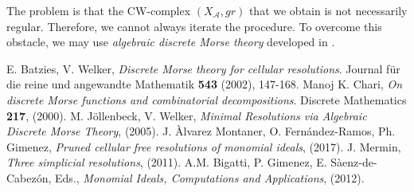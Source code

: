 \documentclass[paper=a4, fontsize=11pt]{scrartcl} %
\theoremstyle{plain}
\theoremstyle{definition}
\begin{document}
The problem is that the CW-complex $(X_{\mathcal{A}},gr)$ that we obtain is not necessarily regular. Therefore, we cannot always iterate the procedure. To overcome this obstacle, we may use \textit{algebraic discrete Morse theory} developed in \cite{JoWe}.

\begin{thebibliography}{9}
E. Batzies, V. Welker, \textit{Discrete Morse theory for cellular resolutions}. Journal f{\"u}r die reine und angewandte Mathematik \textbf{543} (2002), 147-168.
Manoj K. Chari, \textit{On discrete Morse functions and combinatorial decompositions}. Discrete Mathematics \textbf{217}, (2000).
M. J{\"o}llenbeck, V. Welker, \textit{Minimal Resolutions via Algebraic Discrete Morse Theory}, (2005).
J. \`Alvarez Montaner, O. Fern\'andez-Ramos, Ph. Gimenez, \textit{Pruned cellular free resolutions of monomial ideals}, (2017).
J. Mermin, \textit{Three simplicial resolutions}, (2011).
A.M. Bigatti, P. Gimenez, E. S\`aenz-de-Cabez\'on, Eds., \textit{Monomial Ideals, Computations and Applications}, (2012).
\end{thebibliography}
\end{document}
